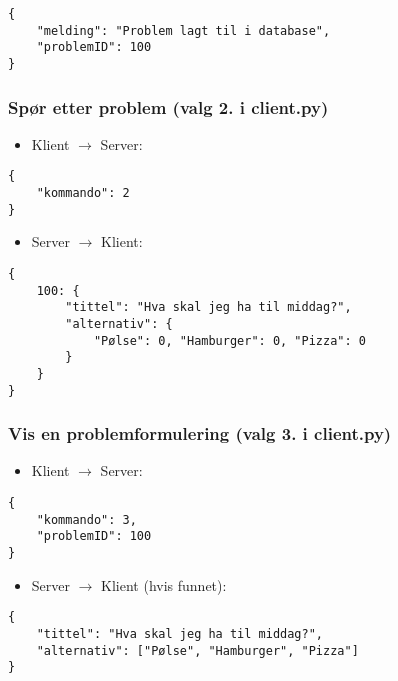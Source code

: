 \documentclass[hidelinks]{article}
\begin{document}
\begin{verbatim}
{
    "melding": "Problem lagt til i database",
    "problemID": 100
}
\end{verbatim}

\newpage

\subsubsection{Spør etter problem (valg 2. i client.py)}

\begin{itemize}
    \item Klient \(\rightarrow\) Server:
\end{itemize}

\begin{verbatim}
{
    "kommando": 2
}
\end{verbatim}

\begin{itemize}
    \item Server \(\rightarrow\) Klient:
\end{itemize}

\begin{verbatim}
{
    100: {
        "tittel": "Hva skal jeg ha til middag?",
        "alternativ": {
            "Pølse": 0, "Hamburger": 0, "Pizza": 0
        }
    }
}
\end{verbatim}

\subsubsection{Vis en problemformulering (valg 3. i client.py)}

\begin{itemize}
    \item Klient \(\rightarrow\) Server:
\end{itemize}

\begin{verbatim}
{
    "kommando": 3,
    "problemID": 100
}
\end{verbatim}

\begin{itemize}
    \item Server \(\rightarrow\) Klient (hvis funnet):
\end{itemize}

\begin{verbatim}
{
    "tittel": "Hva skal jeg ha til middag?",
    "alternativ": ["Pølse", "Hamburger", "Pizza"]
}
\end{verbatim}
\end{document}
